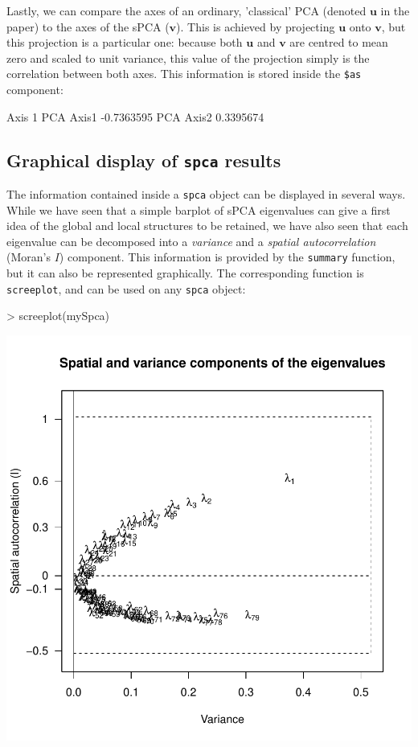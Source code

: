 \documentclass{article}
\newcommand{\m}[1]{\mathbf{#1}}
\begin{document}
\noindent Lastly, we can compare the axes of an ordinary, 'classical'
PCA (denoted $\m{u}$ in the paper) to the axes of the sPCA ($\m{v}$).
This is achieved by projecting $\m{u}$ onto $\m{v}$, but this
projection is a particular one: because both $\m{u}$ and $\m{v}$ are
centred to mean zero and scaled to unit variance, this value of the
projection simply is the correlation between both axes.
This information is stored inside the \texttt{\$as} component:
\begin{Schunk}
\begin{Soutput}
              Axis 1
PCA Axis1 -0.7363595
PCA Axis2  0.3395674
\end{Soutput}
\end{Schunk}





\subsection{Graphical display of \texttt{spca} results}

The information contained inside a \texttt{spca} object can be displayed
in several ways.
While we have seen that a simple barplot of sPCA eigenvalues can give a first idea of the
global and local structures to be retained, we have also seen that
each eigenvalue can be decomposed into a \textit{variance} and a
\textit{spatial autocorrelation} (Moran's $I$) component.
This information is provided by the \texttt{summary} function, but it
can also be represented graphically.
The corresponding function is \texttt{screeplot}, and can be used on any
\texttt{spca} object:
\begin{Schunk}
\begin{Sinput}
> screeplot(mySpca)
\end{Sinput}
\end{Schunk}
\includegraphics{figs/spca-screeplot}
\end{document}
